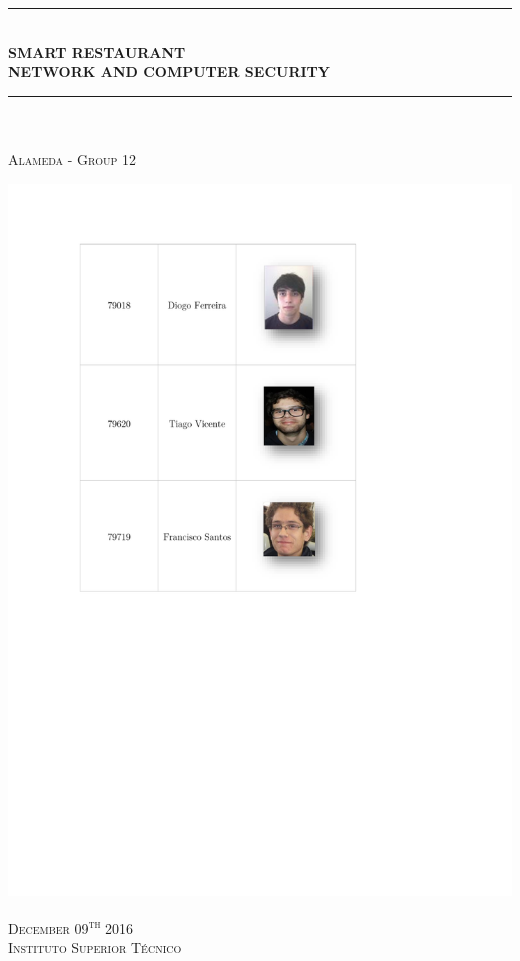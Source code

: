 \documentclass[12pt,paper=a4]{article}
\begin{document}
\begin{titlepage}
	
	\begin{center}
	
		\noindent\rule{16cm}{0.4pt}\\
		\huge{\bfseries SMART RESTAURANT}\\
		\Large{\bfseries NETWORK AND COMPUTER SECURITY}\\
		\noindent\rule{13cm}{0.4pt}\\
		
		
		\hfill\\
		\textsc{\large Alameda - Group 12}\\
	
		\hfill
	
		\includegraphics[scale=0.8,trim=-1.1cm 19cm 0 2cm]{Fotos.pdf}
		
		
		\vfill
		\textsc{\small December 09\textsuperscript{th} 2016}\\
		\textsc{\large Instituto Superior Técnico}\\

	\end{center}
	
\end{titlepage}
\end{document}
